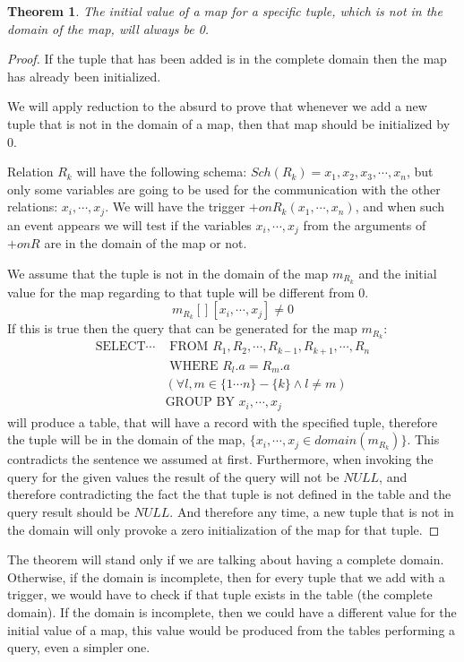 \documentclass[12pt]{article}
\newtheorem{theorem}{Theorem}[section]
\begin{document}
\begin{theorem}
The initial value of a map for a specific tuple, which is not in the domain of the map, will always be 0.
\end{theorem}

\begin{proof}
	If the tuple that has been added is in the complete domain then the map has already been initialized.
	
	We will apply reduction to the absurd to prove that whenever we add a new tuple that is not in the domain of a map, then that map should be initialized by 0.
	
	Relation $R_k$ will have the following schema: $Sch(R_k)={x_1,x_2,x_3,\cdots,x_n}$, but only some variables are going to be used for the communication with the other relations: $x_i,\cdots,x_j$. We will have the trigger $+onR_k(x_1,\cdots,x_n)$, and when such an event appears we will test if the variables $x_i,\cdots,x_j$ from the arguments of $+onR$ are in the domain of the map or not. 
	
	We assume that the tuple is not in the domain of the map $m_{R_k}$ and the initial value for the map regarding to that tuple will be different from 0.
	$$m_{R_k}[][x_i,\cdots,x_j]\not= 0$$
	If this is true then the query that can be generated for the map $m_{R_k}$:
	\begin{align*}
	\mbox{SELECT}\cdots&\mbox{ FROM }R_1,R_2,\cdots,R_{k-1},R_{k+1},\cdots,R_n\\
	&\mbox{ WHERE }R_l.a=R_m.a\\
	&(\forall l,m\in\{1\cdots n\}-\{k\}\land l\not=m)\\
	&\mbox{GROUP BY } x_i,\cdots,x_j
	\end{align*}
	will produce a table, that will have a record with the specified tuple, therefore the tuple will be in the domain of the map, $\{x_i,\cdots,x_j\in domain(m_{R_k}) \}$. This contradicts the sentence we assumed at first. Furthermore, when invoking the query for the given values the result of the query will not be $NULL$, and therefore contradicting the fact the that tuple is not defined in the table and the query result should be $NULL$. And therefore any time, a new tuple that is not in the domain will only provoke a zero initialization of the map for that tuple.
\end{proof}

The theorem will stand only if we are talking about having a complete domain. Otherwise, if the domain is incomplete, then for every tuple that we add with a trigger, we would have to check if that tuple exists in the table (the complete domain). If the domain is incomplete, then we could have a different value for the initial value of a map, this value would be produced from the tables performing a query, even a simpler one.
\end{document}
